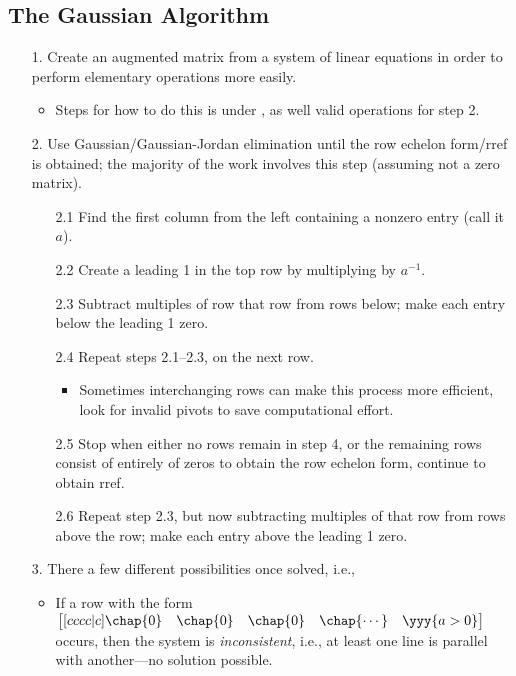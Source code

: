 \begin{itemize}
  \subsection{The Gaussian Algorithm}\label{The Gaussian Algorithm}
  \begin{itemize}
    \item[1.] Create an augmented matrix from a system of linear equations in order to perform elementary operations more easily. 
      \begin{itemize}
        \item Steps for how to do this is under \hyperref[Elementary Operations]{}, as well valid operations for step 2.
      \end{itemize}
    \item[2.] Use Gaussian/Gaussian-Jordan elimination until the row echelon form/rref is obtained; the majority of the work involves this step (assuming not a zero matrix). 
    \begin{enumerate}
      \item[2.1] Find the first column from the left containing a nonzero entry (call it \(a\)).
      \item[2.2] Create a leading 1 in the top row by multiplying by \(a^{-1}\).
      \item[2.3] Subtract multiples of row that row from rows below; make each entry below the leading 1 zero. 
      \item[2.4] Repeat steps 2.1--2.3, on the next row.
      \begin{itemize}
        \item Sometimes interchanging rows can make this process more efficient, look for invalid pivots to save computational effort.
      \end{itemize}
      \item[2.5] Stop when either no rows remain in step 4, or the remaining rows consist of entirely of zeros to obtain the row echelon form, continue to obtain rref.
      \item[2.6] Repeat step 2.3, but now subtracting multiples of that row from rows above the row; make each entry above the leading 1 zero.
    \end{enumerate}
    \item[3.] There a few different possibilities once solved, i.e.,
    \begin{itemize}
      \item If a row with the form 
      \(\begin{bmatrix}[cccc|c] \chap{0} & \chap{0} & \chap{0} &\chap{\cdots} & \yyy{a > 0} \end{bmatrix}\) occurs, then the system is \emph{inconsistent}, i.e., at least one line is parallel with another---no solution possible.

\end{itemize}
\end{itemize}
\end{itemize}
